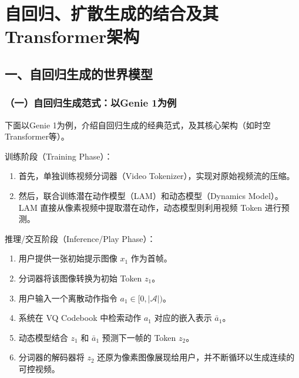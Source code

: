 \setcounter{section}{0}

\hypertarget{ux81eaux56deux5f52ux6269ux6563ux751fux6210ux7684ux7ed3ux5408ux53caux5176transformerux67b6ux6784}{%
\section{自回归、扩散生成的结合及其Transformer架构}\label{ux81eaux56deux5f52ux6269ux6563ux751fux6210ux7684ux7ed3ux5408ux53caux5176transformerux67b6ux6784}}

\hypertarget{ux4e00ux81eaux56deux5f52ux751fux6210ux7684ux4e16ux754cux6a21ux578b}{%
\subsection{一、自回归生成的世界模型}\label{ux4e00ux81eaux56deux5f52ux751fux6210ux7684ux4e16ux754cux6a21ux578b}}

\hypertarget{ux4e00ux81eaux56deux5f52ux751fux6210ux8303ux5f0fux4ee5genie-1ux4e3aux4f8b}{%
\subsubsection{（一）自回归生成范式：以Genie 1为例}\label{ux4e00ux81eaux56deux5f52ux751fux6210ux8303ux5f0fux4ee5genie-1ux4e3aux4f8b}}

下面以Genie 1为例，介绍自回归生成的经典范式，及其核心架构（如时空Transformer等）。

训练阶段（Training Phase）：

\begin{enumerate}
\def\labelenumi{\arabic{enumi}.}
\item
  首先，单独训练视频分词器（Video Tokenizer），实现对原始视频流的压缩。
\item
  然后，联合训练潜在动作模型（LAM）和动态模型（Dynamics Model）。LAM 直接从像素视频中提取潜在动作，动态模型则利用视频 Token 进行预测。
\end{enumerate}

推理/交互阶段（Inference/Play Phase）：

\begin{enumerate}
\def\labelenumi{\arabic{enumi}.}
\item
  用户提供一张初始提示图像 \(x_1\) 作为首帧。
\item
  分词器将该图像转换为初始 Token \(z_1\)。
\item
  用户输入一个离散动作指令 \(a_1\in[0,|\mathcal{A}|)\)。
\item
  系统在 VQ Codebook 中检索动作 \(a_1\) 对应的嵌入表示 \(\bar{a}_1\)。
\item
  动态模型结合 \(z_1\) 和 \(\bar{a}_1\) 预测下一帧的 Token \(z_2\)。
\item
  分词器的解码器将 \(z_2\) 还原为像素图像展现给用户，并不断循环以生成连续的可控视频。
\end{enumerate}

